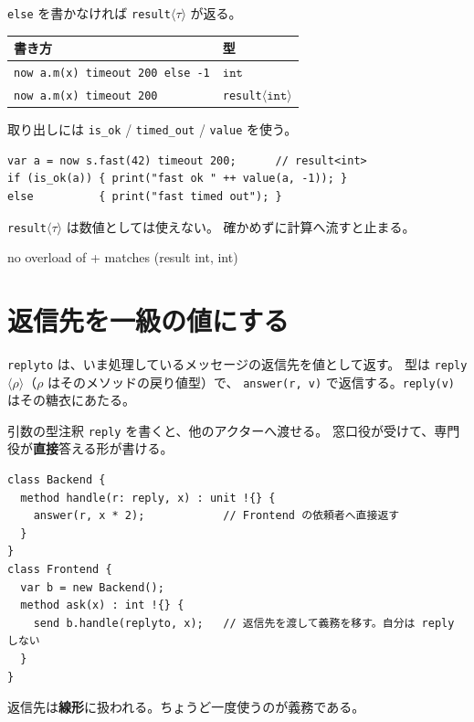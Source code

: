 \documentclass[11pt,a4paper]{ltjsarticle}
\newcommand{\ty}[1]{\ensuremath{\mathtt{#1}}}
\begin{document}
\texttt{else} を書かなければ \texttt{result}$\langle\tau\rangle$ が返る。

\begin{center}
\begin{tabular}{@{}ll@{}}
\toprule
書き方 & 型 \\
\midrule
\texttt{now a.m(x) timeout 200 else -1} & \ty{int} \\
\texttt{now a.m(x) timeout 200} & \texttt{result}$\langle$\ty{int}$\rangle$ \\
\bottomrule
\end{tabular}
\end{center}

取り出しには \texttt{is\_ok} / \texttt{timed\_out} / \texttt{value} を使う。

\begin{lstlisting}
var a = now s.fast(42) timeout 200;      // result<int>
if (is_ok(a)) { print("fast ok " ++ value(a, -1)); }
else          { print("fast timed out"); }
\end{lstlisting}

\texttt{result}$\langle\tau\rangle$ は数値としては使えない。
確かめずに計算へ流すと止まる。

\begin{term}
no overload of + matches (result int, int)
\end{term}

\section{返信先を一級の値にする}
\label{sec:reply1st}

\texttt{replyto} は、いま処理しているメッセージの返信先を値として返す。
型は \texttt{reply}$\langle\rho\rangle$（$\rho$ はそのメソッドの戻り値型）で、
\texttt{answer(r, v)} で返信する。\texttt{reply(v)} はその糖衣にあたる。

引数の型注釈 \texttt{reply} を書くと、他のアクターへ渡せる。
窓口役が受けて、専門役が\textbf{直接}答える形が書ける。

\begin{lstlisting}
class Backend {
  method handle(r: reply, x) : unit !{} {
    answer(r, x * 2);            // Frontend の依頼者へ直接返す
  }
}
class Frontend {
  var b = new Backend();
  method ask(x) : int !{} {
    send b.handle(replyto, x);   // 返信先を渡して義務を移す。自分は reply しない
  }
}
\end{lstlisting}

返信先は\textbf{線形}に扱われる。ちょうど一度使うのが義務である。
\end{document}
